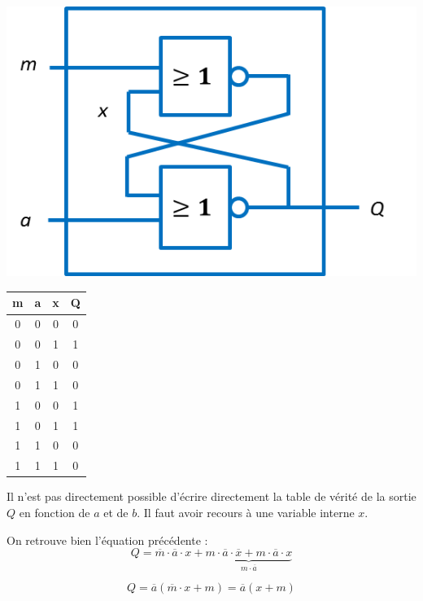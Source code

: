 \documentclass[10pt,fleqn]{article} %
\begin{document}
\begin{minipage}[c]{.3\linewidth}
\begin{center}
\includegraphics[width=\textwidth]{images/mem_eff_nor}
\end{center}
\end{minipage} \hfill
\begin{minipage}[c]{.2\linewidth}
\begin{center}
\begin{tabular}{|c|c|c||c|}
\hline
m & a & x & Q \\
\hline \hline
0 & 0 & 0 & 0 \\\hline
0 & 0 & 1 & 1 \\\hline
0 & 1 & 0 & 0 \\\hline
0 & 1 & 1 & 0 \\\hline
1 & 0 & 0 & 1 \\\hline
1 & 0 & 1 & 1 \\\hline
1 & 1 & 0 & 0 \\\hline
1 & 1 & 1 & 0 \\\hline
\end{tabular}
\end{center}
\end{minipage} \hfill
\begin{minipage}[c]{.4\linewidth}
Il  n'est pas directement possible d'écrire directement la table de vérité de la sortie $Q$ en fonction de $a$ et de $b$. Il faut avoir recours à une variable interne $x$. 

On retrouve bien l'équation précédente : 
$$
Q = \overline{m}\cdot \overline{a} \cdot x + \underbrace{m\cdot \overline{a} \cdot \overline{x} 
+ m\cdot \overline{a} \cdot x}_{m\cdot \overline{a} } 
$$

$$Q
= \overline{a} \left(\overline{m} \cdot x + m\right)
= \overline{a} \left( x + m\right)
$$

\end{minipage}
\end{document}
